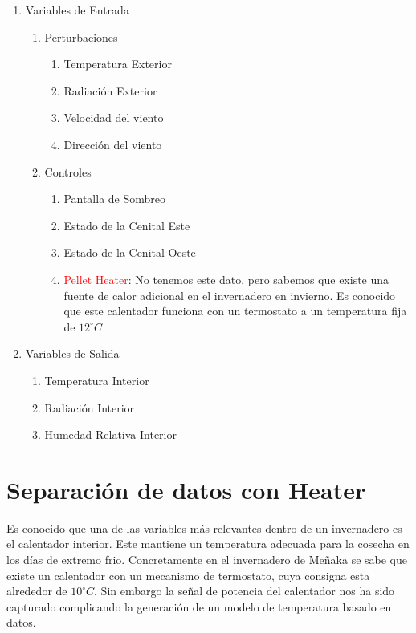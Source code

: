 \begin{enumerate}
    \item Variables de Entrada
    \begin{enumerate}
        \item Perturbaciones
        \begin{enumerate}
            \item Temperatura Exterior 
            \item Radiación Exterior
            \item Velocidad del viento
            \item Dirección del viento
        \end{enumerate}
        \item Controles
        \begin{enumerate}
            \item Pantalla de Sombreo
            \item Estado de la Cenital Este
            \item Estado de la Cenital Oeste
            \item \textcolor{red}{Pellet Heater}: No tenemos este dato, pero sabemos que existe una fuente de calor adicional en el invernadero en invierno. Es conocido que este calentador funciona con un termostato a un temperatura fija de $12 ^\circ C$
        \end{enumerate}
    \end{enumerate}

    \item Variables de Salida
    \begin{enumerate}
        \item Temperatura Interior
        \item Radiación Interior
        \item Humedad Relativa Interior
    \end{enumerate}
\end{enumerate}

\section{Separación de datos con Heater}

Es conocido que una de las variables más relevantes  dentro de un invernadero es el calentador interior. Este mantiene un temperatura adecuada para la cosecha en los días de extremo frio. Concretamente en el invernadero de Meñaka se sabe que existe un calentador con un mecanismo de termostato, cuya consigna esta alrededor de $10^\circ C$. Sin embargo la señal de potencia del calentador nos ha sido capturado complicando la generación de un modelo de temperatura basado en datos. 

